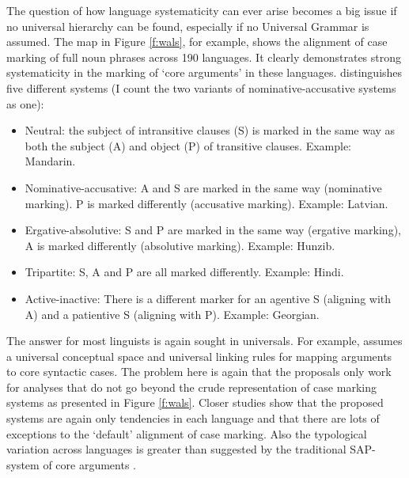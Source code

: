 The question of how language systematicity can ever arise becomes a big issue if no universal hierarchy can be found, especially if no Universal Grammar is assumed. The map in Figure \ref{f:wals}, for example, shows the alignment of case marking of full noun phrases across 190 languages. It clearly demonstrates strong systematicity in the marking of `core arguments' in these languages. \citet{comrie05wals} distinguishes five different systems (I count the two variants of nominative-accusative systems as one):

\begin{itemize}
\item Neutral: the subject of intransitive clauses (S) is marked in the same way as both the subject (A) and object (P) of transitive clauses. Example: Mandarin.
\item Nominative-accusative: A and S are marked in the same way (nominative marking). P is marked differently (accusative marking). Example: Latvian.
\item Ergative-absolutive: S and P are marked in the same way (ergative marking), A is marked differently (absolutive marking). Example: Hunzib.
\item Tripartite: S, A and P are all marked differently. Example: Hindi.
\item Active-inactive: There is a different marker for an agentive S (aligning with A) and a patientive S (aligning with P). Example: Georgian. 
\end{itemize}

The answer for most linguists is again sought in universals. For example, \citet{croft98event} assumes a universal conceptual space and universal linking rules for mapping arguments to core syntactic cases. The problem here is again that the proposals only work for analyses that do not go beyond the crude representation of case marking systems as presented in Figure \ref{f:wals}. Closer studies show that the proposed systems are again only tendencies in each language and that there are lots of exceptions to the `default' alignment of case marking. Also the typological variation across languages is greater than suggested by the traditional SAP-system of core arguments \citep{mithun05beyond}.


